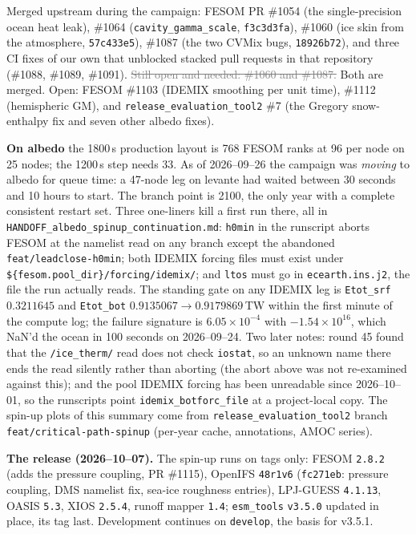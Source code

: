 \documentclass[10pt]{article}
\newcommand{\dead}[1]{\textcolor{gray}{\sout{#1}}}
\begin{document}
Merged upstream during the campaign: FESOM PR \#1054 (the single-precision ocean heat
leak), \#1064 (\texttt{cavity\_gamma\_scale}, \texttt{f3c3d3fa}), \#1060 (ice skin from the
atmosphere, \texttt{57c433e5}), \#1087 (the two CVMix bugs, \texttt{18926b72}), and three CI fixes
of our own that unblocked stacked pull requests in that repository (\#1088, \#1089, \#1091).
\dead{Still open and needed: \#1060 and \#1087.} Both are merged. Open: FESOM \#1103 (IDEMIX
smoothing per unit time), \#1112 (hemispheric GM), and \texttt{release\_evaluation\_tool2} \#7 (the
Gregory snow-enthalpy fix and seven other albedo fixes).

\textbf{On albedo} the 1800\,s production layout is 768 FESOM ranks at 96 per node on 25 nodes; the
1200\,s step needs 33. As of 2026--09--26 the campaign was \emph{moving} to albedo for queue time: a 47-node leg on levante had
waited between 30 seconds and 10 hours to start. The branch point is 2100, the only year
with a complete consistent restart set. Three one-liners kill a first run there, all in
\texttt{HANDOFF\_albedo\_spinup\_continuation.md}: \texttt{h0min} in the runscript aborts
FESOM at the namelist read on any branch except the abandoned
\texttt{feat/leadclose-h0min}; both IDEMIX forcing files must exist under
\texttt{\$\{fesom.pool\_dir\}/forcing/idemix/}; and \texttt{ltos} must go in
\texttt{ecearth.ins.j2}, the file the run actually reads. The standing gate on any IDEMIX
leg is \texttt{Etot\_srf} $0.3211645$ and \texttt{Etot\_bot}
$0.9135067\to0.9179869$\,TW within the first minute of the compute log; the failure
signature is $6.05\times10^{-4}$ with $-1.54\times10^{16}$, which NaN'd the ocean in 100
seconds on 2026--09--24. Two later notes: round 45 found that the \texttt{/ice\_therm/} read does
not check \texttt{iostat}, so an unknown name there ends the read silently rather than aborting
(the abort above was not re-examined against this); and the pool IDEMIX forcing has been unreadable
since 2026--10--01, so the runscripts point \texttt{idemix\_botforc\_file} at a project-local copy.
The spin-up plots of this summary come from \texttt{release\_evaluation\_tool2} branch
\texttt{feat/critical-path-spinup} (per-year cache, annotations, AMOC series).

\textbf{The release (2026--10--07).} The spin-up runs on tags only: FESOM \texttt{2.8.2} (adds the
pressure coupling, PR \#1115), OpenIFS \texttt{48r1v6} (\texttt{fc271eb}: pressure coupling, DMS namelist
fix, sea-ice roughness entries), LPJ-GUESS \texttt{4.1.13}, OASIS \texttt{5.3}, XIOS \texttt{2.5.4}, runoff
mapper \texttt{1.4}; \texttt{esm\_tools} \texttt{v3.5.0} updated in place, its tag last. Development continues
on \texttt{develop}, the basis for v3.5.1.
\end{document}
